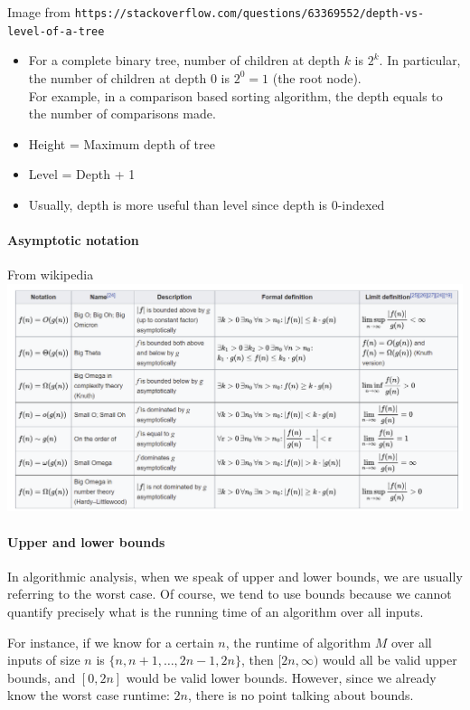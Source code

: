 \documentclass{article}
\begin{document}
Image from \texttt{https://stackoverflow.com/questions/63369552/depth-vs-level-of-a-tree}
\begin{itemize}
	\item For a complete binary tree, number of children at depth $k$ is $2^k$. In particular, the number of children at depth $0$ is $2^0=1$ (the root node).\\
	For example, in a comparison based sorting algorithm, the depth equals to the number of comparisons made.
	\item Height = Maximum depth of tree
	\item Level = Depth + 1
	\item Usually, depth is more useful than level since depth is $0$-indexed
\end{itemize}

\paragraph{Asymptotic notation} From wikipedia\\
\includegraphics[scale=0.5]{asymptotic_notation.png}


\paragraph{Upper and lower bounds} In algorithmic analysis, when we speak of upper and lower bounds, we are usually referring to the worst case. Of course, we tend to use bounds because we cannot quantify precisely what is the running time of an algorithm over all inputs.

For instance, if we know for a certain $n$, the runtime of algorithm $M$ over all inputs of size $n$ is $\{n,n+1,\dots,2n-1, 2n\}$, then $[2n, \infty)$ would all be valid upper bounds, and $[0, 2n]$ would be valid lower bounds. However, since we already know the worst case runtime: $2n$, there is no point talking about bounds.
\end{document}
